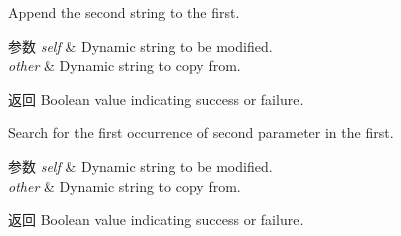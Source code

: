 Append the second string to the first.


\begin{DoxyParams}{参数}
{\em self} & Dynamic string to be modified. \\
\hline
{\em other} & Dynamic string to copy from. \\
\hline
\end{DoxyParams}
\begin{DoxyReturn}{返回}
Boolean value indicating success or failure.
\end{DoxyReturn}
Search for the first occurrence of second parameter in the first.


\begin{DoxyParams}{参数}
{\em self} & Dynamic string to be modified. \\
\hline
{\em other} & Dynamic string to copy from. \\
\hline
\end{DoxyParams}
\begin{DoxyReturn}{返回}
Boolean value indicating success or failure. 
\end{DoxyReturn}
